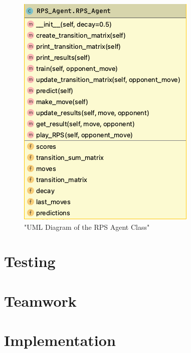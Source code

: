 \documentclass{IEEEtran}
\begin{document}
	
	
	\begin{figure}\label{UML}
		\centering
		\includegraphics[scale=0.5]{RPS_Agent.png}
		\caption{"UML Diagram of the RPS Agent Class"}
	\end{figure}
	
	
	\section{Testing}
		\lipsum
		
	\section{Teamwork}
			
			
	\section{Implementation}
	
	
	
\end{document}
